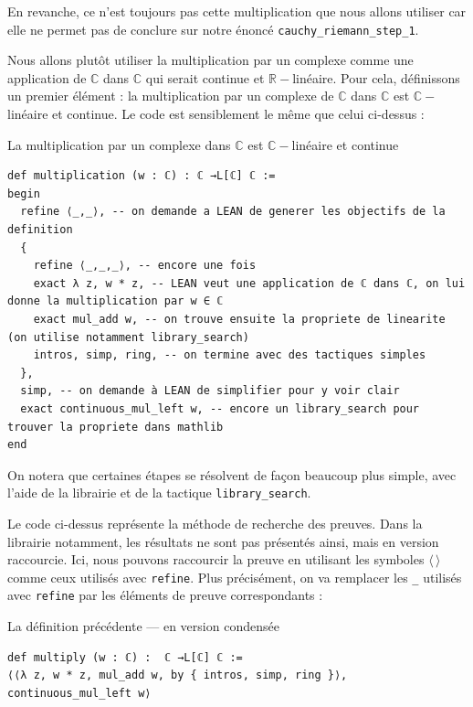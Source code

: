 \documentclass[a4paper, 11pt, twoside]{report}
\newcommand\R{\mathbb{R}}
\newcommand\C{\mathbb{C}}
\begin{document}
En revanche, ce n'est toujours pas cette multiplication que nous allons utiliser car elle ne permet pas de conclure sur notre énoncé \verb|cauchy_riemann_step_1|.

\medskip

Nous allons plutôt utiliser la multiplication par un complexe comme une application de $\C$ dans $\C$ qui serait continue et $\R-$linéaire. Pour cela, définissons un premier élément : la multiplication par un complexe de $\C$ dans $\C$ est $\C-$linéaire et continue. Le code est sensiblement le même que celui ci-dessus :

\begin{code}{La multiplication par un complexe dans $\C$ est $\C-$linéaire et continue}
\begin{lstlisting}
def multiplication (w : ℂ) : ℂ →L[ℂ] ℂ :=
begin
  refine ⟨_,_⟩, -- on demande a LEAN de generer les objectifs de la definition
  {
    refine ⟨_,_,_⟩, -- encore une fois
    exact λ z, w * z, -- LEAN veut une application de ℂ dans ℂ, on lui donne la multiplication par w ∈ ℂ
    exact mul_add w, -- on trouve ensuite la propriete de linearite (on utilise notamment library_search)
    intros, simp, ring, -- on termine avec des tactiques simples
  },
  simp, -- on demande à LEAN de simplifier pour y voir clair
  exact continuous_mul_left w, -- encore un library_search pour trouver la propriete dans mathlib
end 
\end{lstlisting}
\end{code}

On notera que certaines étapes se résolvent de façon beaucoup plus simple, avec l'aide de la librairie et de la tactique \verb|library_search|. 

\medskip

Le code ci-dessus représente la méthode de recherche des preuves. Dans la librairie notamment, les résultats ne sont pas présentés ainsi, mais en version raccourcie. Ici, nous pouvons raccourcir la preuve en utilisant les symboles $\langle\,\rangle$ comme ceux utilisés avec \verb|refine|. Plus précisément, on va remplacer les \verb|_| utilisés avec \verb|refine| par les éléments de preuve correspondants :

\begin{code}{La définition précédente --- en version condensée}
\begin{lstlisting}
def multiply (w : ℂ) :  ℂ →L[ℂ] ℂ :=
⟨⟨λ z, w * z, mul_add w, by { intros, simp, ring }⟩, continuous_mul_left w⟩
\end{lstlisting}
\end{code}
\end{document}

